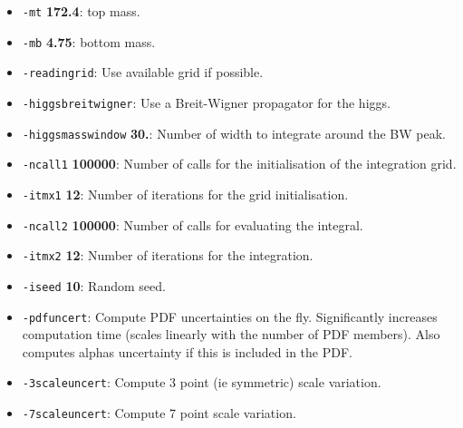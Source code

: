 \documentclass[12pt,a4]{article}
\begin{document}
\begin{itemize}
\item\texttt{-mt} {\bf 172.4}: top mass.

\item\texttt{-mb} {\bf 4.75}: bottom mass.
  
\item\texttt{-readingrid}: Use available grid if possible.

\item\texttt{-higgsbreitwigner}: Use a Breit-Wigner propagator for the higgs.

\item\texttt{-higgsmasswindow} {\bf 30.}: Number of width to integrate around the BW peak.
  
\item\texttt{-ncall1} {\bf 100000}: Number of calls for the initialisation of the integration grid.

\item\texttt{-itmx1} {\bf 12}: Number of iterations for the grid initialisation.
  
\item\texttt{-ncall2} {\bf 100000}: Number of calls for evaluating the integral.

\item\texttt{-itmx2} {\bf 12}: Number of iterations for the integration.

\item\texttt{-iseed} {\bf 10}: Random seed.

\item\texttt{-pdfuncert}: Compute PDF uncertainties on the fly. Significantly increases computation time (scales linearly with the number of PDF members). Also computes alphas uncertainty if this is included in the PDF.

\item\texttt{-3scaleuncert}: Compute 3 point (ie symmetric) scale variation.

\item\texttt{-7scaleuncert}: Compute 7 point scale variation.

\end{itemize}
\end{document}
